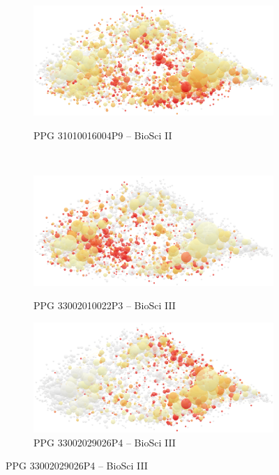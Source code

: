 \begin{figure}[H]
\begin{subfigure}[t]{.48\textwidth}
    \label{fig:classif:vosviewer_cb2a}
  \end{subfigure}
  \hfill
  \begin{subfigure}[t]{.48\textwidth}
    \centering
    \caption{PPG 31010016004P9 – BioSci II}
    \includegraphics[width=\linewidth]{images/chapter_classific/VOSviewer-CBIIb.png}
    \label{fig:classif:vosviewer_cb2b}
  \end{subfigure}\\ %
    \begin{subfigure}[t]{.48\textwidth}
    \centering
    \caption{PPG 33002010022P3 – BioSci III}
    \includegraphics[width=\linewidth]{images/chapter_classific/VOSviewer-CBIIIa.png}
    \label{fig:classif:vosviewer_cb3a}
  \end{subfigure}
  \hfill
  \begin{subfigure}[t]{.48\textwidth}
    \centering
    \caption{PPG 33002029026P4 – BioSci III}
    \includegraphics[width=\linewidth]{images/chapter_classific/VOSviewer-CBIIIb.png}

\end{subfigure}
\end{figure}
